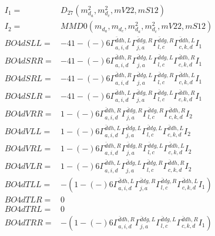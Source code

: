 \documentclass[A4,landscape]{article}
\begin{document}
\begin{align} 
I_1 = & D_{27}(m^2_{d_{{a}}}, m^2_{d_{{c}}}, mV22, mS12) \\ 
I_2 = & MMD0(m_{d_{{a}}}, m_{d_{{c}}}, m^2_{d_{{a}}}, m^2_{d_{{c}}}, mV22, mS12) \\ 
  BO4dSLL= & -4   1
-(-)
  6 \Gamma^{\bar{d}d h ,L}_{a, i, d} \Gamma^{\bar{d}d g ,R}_{j, a} \Gamma^{\bar{d}d g ,R}_{l, c} \Gamma^{\bar{d}d h ,L}_{c, k, d} I_1 \\ 
  BO4dSRR= & -4   1
-(-)
  6 \Gamma^{\bar{d}d h ,R}_{a, i, d} \Gamma^{\bar{d}d g ,L}_{j, a} \Gamma^{\bar{d}d g ,L}_{l, c} \Gamma^{\bar{d}d h ,R}_{c, k, d} I_1 \\ 
  BO4dSRL= & -4   1
-(-)
  6 \Gamma^{\bar{d}d h ,R}_{a, i, d} \Gamma^{\bar{d}d g ,L}_{j, a} \Gamma^{\bar{d}d g ,R}_{l, c} \Gamma^{\bar{d}d h ,L}_{c, k, d} I_1 \\ 
  BO4dSLR= & -4   1
-(-)
  6 \Gamma^{\bar{d}d h ,L}_{a, i, d} \Gamma^{\bar{d}d g ,R}_{j, a} \Gamma^{\bar{d}d g ,L}_{l, c} \Gamma^{\bar{d}d h ,R}_{c, k, d} I_1 \\ 
  BO4dVRR= &   1
-(-)
  6 \Gamma^{\bar{d}d h ,R}_{a, i, d} \Gamma^{\bar{d}d g ,R}_{j, a} \Gamma^{\bar{d}d g ,R}_{l, c} \Gamma^{\bar{d}d h ,R}_{c, k, d} I_2 \\ 
  BO4dVLL= &   1
-(-)
  6 \Gamma^{\bar{d}d h ,L}_{a, i, d} \Gamma^{\bar{d}d g ,L}_{j, a} \Gamma^{\bar{d}d g ,L}_{l, c} \Gamma^{\bar{d}d h ,L}_{c, k, d} I_2 \\ 
  BO4dVRL= &   1
-(-)
  6 \Gamma^{\bar{d}d h ,R}_{a, i, d} \Gamma^{\bar{d}d g ,R}_{j, a} \Gamma^{\bar{d}d g ,L}_{l, c} \Gamma^{\bar{d}d h ,L}_{c, k, d} I_2 \\ 
  BO4dVLR= &   1
-(-)
  6 \Gamma^{\bar{d}d h ,L}_{a, i, d} \Gamma^{\bar{d}d g ,L}_{j, a} \Gamma^{\bar{d}d g ,R}_{l, c} \Gamma^{\bar{d}d h ,R}_{c, k, d} I_2 \\ 
  BO4dTLL= & -(  1
-(-)
  6 \Gamma^{\bar{d}d h ,L}_{a, i, d} \Gamma^{\bar{d}d g ,R}_{j, a} \Gamma^{\bar{d}d g ,R}_{l, c} \Gamma^{\bar{d}d h ,L}_{c, k, d} I_1) \\ 
  BO4dTLR= & 0 \\ 
  BO4dTRL= & 0 \\ 
  BO4dTRR= & -(  1
-(-)
  6 \Gamma^{\bar{d}d h ,R}_{a, i, d} \Gamma^{\bar{d}d g ,L}_{j, a} \Gamma^{\bar{d}d g ,L}_{l, c} \Gamma^{\bar{d}d h ,R}_{c, k, d} I_1) \\ 
\end{align} 
\end{document}
